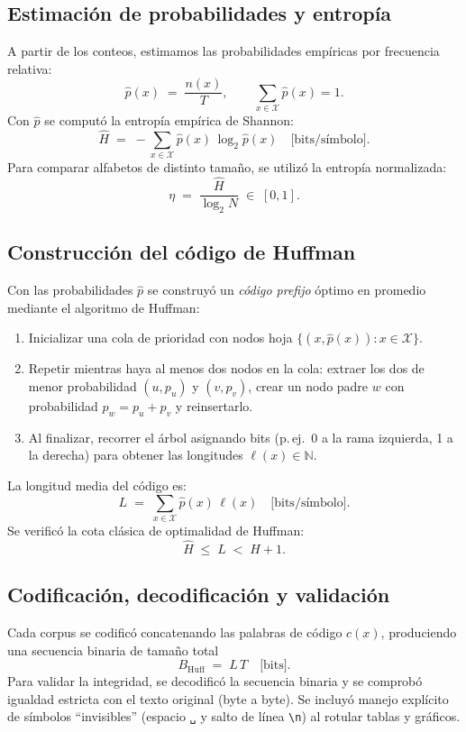 \documentclass[12pt, a4paper]{article}
\begin{document}
\subsection*{Estimación de probabilidades y entropía}
A partir de los conteos, estimamos las probabilidades empíricas por frecuencia relativa:
\[
\hat p(x) \;=\; \frac{n(x)}{T}, 
\qquad \sum_{x\in\mathcal{X}} \hat p(x)=1.
\]
Con $\hat p$ se computó la entropía empírica de Shannon:
\[
\hat H \;=\; - \sum_{x\in\mathcal{X}} \hat p(x)\,\log_2 \hat p(x)
\quad \text{[bits/símbolo].}
\]
Para comparar alfabetos de distinto tamaño, se utilizó la entropía normalizada:
\[
\eta \;=\; \frac{\hat H}{\log_2 N} \;\in\; [0,1].
\]

\subsection*{Construcción del código de Huffman}
Con las probabilidades $\hat p$ se construyó un \emph{código prefijo} óptimo en promedio mediante el algoritmo de Huffman:
\begin{enumerate}
  \item Inicializar una cola de prioridad con nodos hoja $\{(x,\hat p(x)) : x\in\mathcal{X}\}$.
  \item Repetir mientras haya al menos dos nodos en la cola: extraer los dos de menor probabilidad $(u,p_u)$ y $(v,p_v)$, crear un nodo padre $w$ con probabilidad $p_w=p_u+p_v$ y reinsertarlo.
  \item Al finalizar, recorrer el árbol asignando bits (p.\,ej.\ 0 a la rama izquierda, 1 a la derecha) para obtener las longitudes $\ell(x)\in\mathbb{N}$.
\end{enumerate}
La longitud media del código es:
\[
L \;=\; \sum_{x\in\mathcal{X}} \hat p(x)\,\ell(x)
\quad \text{[bits/símbolo].}
\]
Se verificó la cota clásica de optimalidad de Huffman:
\[
\hat H \;\le\; L \;<\; \hat H + 1.
\]

\subsection*{Codificación, decodificación y validación}
Cada corpus se codificó concatenando las palabras de código $c(x)$, produciendo una secuencia binaria de tamaño total
\[
B_{\text{Huff}} \;=\; L \, T \quad \text{[bits].}
\]
Para validar la integridad, se decodificó la secuencia binaria y se comprobó igualdad estricta con el texto original (byte a byte). 
Se incluyó manejo explícito de símbolos ``invisibles'' (espacio \verb|␣| y salto de línea \verb|\n|) al rotular tablas y gráficos.
\end{document}
